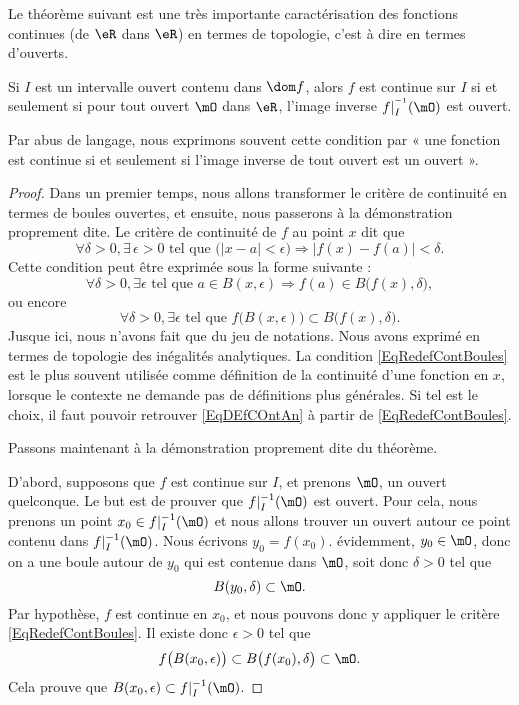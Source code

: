 Le théorème suivant est une très importante caractérisation des fonctions continues (de $\eR$ dans $\eR$) en termes de topologie, c'est à dire en termes d'ouverts.

\begin{theorem}     \label{ThoContInvOuvert}
Si $I$ est un intervalle ouvert contenu dans $\dom f$, alors $f$ est continue sur $I$ si et seulement si pour tout ouvert $\mO$ dans $\eR$, l'image inverse $f|_I^{^{-1}}(\mO)$ est ouvert.
\end{theorem}

Par abus de langage, nous exprimons souvent cette condition par « une fonction est continue si et seulement si l'image inverse de tout ouvert est un ouvert ».

\begin{proof}

Dans un premier temps, nous allons transformer le critère de continuité en termes de boules ouvertes, et ensuite, nous passerons à la démonstration proprement dite. Le critère de continuité de $f$ au point $x$ dit que
\begin{equation}        \label{EqDEfCOntAn}
  \forall \delta>0,\exists\,\epsilon>0\text{ tel que }\big( | x-a |< \epsilon \big)\Rightarrow| f(x)-f(a) |<\delta.
\end{equation}
Cette condition peut être exprimée sous la forme suivante :
\[
  \forall \delta>0,\exists\epsilon\text{ tel que } a\in B(x,\epsilon)\Rightarrow f(a)\in B\big( f(x),\delta \big),
\]
ou encore
\begin{equation}        \label{EqRedefContBoules}
  \forall \delta>0,\exists\epsilon\text{ tel que } f\big( B(x,\epsilon) \big)\subset B\big( f(x),\delta \big).
\end{equation}
Jusque ici, nous n'avons fait que du jeu de notations. Nous avons exprimé en termes de topologie des inégalités analytiques. La condition \eqref{EqRedefContBoules} est le plus souvent utilisée comme définition de la continuité d'une fonction en \( x\), lorsque le contexte ne demande pas de définitions plus générales. Si tel est le choix, il faut pouvoir retrouver \eqref{EqDEfCOntAn} à partir de \eqref{EqRedefContBoules}.

Passons maintenant à la démonstration proprement dite du théorème.

D'abord, supposons que $f$ est continue sur $I$, et prenons $\mO$, un ouvert quelconque. Le but est de prouver que $f|_I^{-1}(\mO)$ est ouvert. Pour cela, nous prenons un point $x_0\in f|_I^{-1}(\mO)$ et nous allons trouver un ouvert autour ce point contenu dans $f|_I^{-1}(\mO)$. Nous écrivons $y_0=f(x_0)$. évidemment, $y_0\in\mO$, donc on a une boule autour de $y_0$ qui est contenue dans $\mO$, soit donc $\delta>0$ tel que
\[
  B(y_0,\delta)\subset\mO.
\]
Par hypothèse, $f$ est continue en $x_0$, et nous pouvons donc y appliquer le critère \eqref{EqRedefContBoules}. Il existe donc $\epsilon>0$ tel que
\[
  f\big( B(x_0,\epsilon) \big)\subset B\big( f(x_0),\delta \big)\subset\mO.
\]
Cela prouve que $B(x_0,\epsilon)\subset f|_I^{-1}(\mO)$.


\end{proof}
